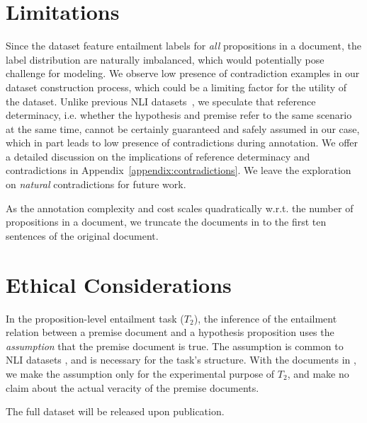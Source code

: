 \section*{Limitations}
Since the \datasetname dataset feature entailment labels for \textit{all} propositions in a document, the label distribution are naturally imbalanced, which would potentially pose challenge for modeling. We observe low presence of contradiction examples in our dataset construction process, which could be a limiting factor for the utility of the dataset.
Unlike previous NLI datasets~\cite{bowman-etal-2015-large, williams-etal-2018-broad}, we speculate that reference determinacy, i.e. whether the hypothesis and premise refer to the same scenario at the same time, cannot be certainly guaranteed and safely assumed in our case, which in part leads to low presence of contradictions during annotation.
We offer a detailed discussion on the implications of reference determinacy and contradictions in Appendix~\ref{appendix:contradictions}. We leave the exploration on \emph{natural} contradictions for future work. 

As the annotation complexity and cost scales quadratically w.r.t. the number of propositions in a document, we truncate the documents in \datasetname to the first ten sentences of the original document. 

\section*{Ethical Considerations}
In the proposition-level entailment task ($T_2$), the inference of the entailment relation between a premise document and a hypothesis proposition uses the \emph{assumption} that the premise document is true. The assumption is common to NLI datasets \cite{dagan2005pascal, bowman-etal-2015-large, williams-etal-2018-broad}, and is necessary for the task's structure. With the documents in \datasetname, we make the assumption only for the experimental purpose of $T_2$, and make no claim about the actual veracity of the premise documents.

The full dataset will be released upon publication.
